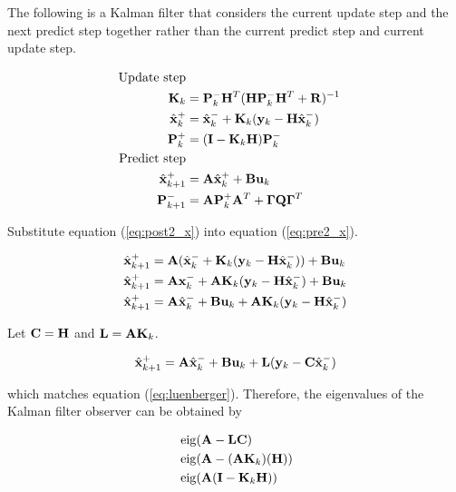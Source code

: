 The following is a Kalman filter that considers the current update step and the
next predict step together rather than the current predict step and current
update step.

\begin{align}
  \text{Update step} \nonumber \\
  \mathbf{K}_k &= \mathbf{P}_k^- \mathbf{H}^T (\mathbf{H}\mathbf{P}_k^- \mathbf{H}^T +
    \mathbf{R})^{-1} \\
  \hat{\mathbf{x}}_k^+ &= \hat{\mathbf{x}}_k^- + \mathbf{K}_k(\mathbf{y}_k -
    \mathbf{H}\hat{\mathbf{x}}_k^-) \label{eq:post2_x} \\
  \mathbf{P}_k^+ &= (\mathbf{I} - \mathbf{K}_k\mathbf{H})\mathbf{P}_k^- \\
  \text{Predict step} \nonumber \\
  \hat{\mathbf{x}}_{k+1}^+ &= \mathbf{A}\hat{\mathbf{x}}_k^+ + \mathbf{B}\mathbf{u}_k
    \label{eq:pre2_x} \\
  \mathbf{P}_{k+1}^- &= \mathbf{A} \mathbf{P}_k^+ \mathbf{A}^T +
    \mathbf{\Gamma}\mathbf{Q}\mathbf{\Gamma}^T
\end{align}

Substitute equation (\ref{eq:post2_x}) into equation (\ref{eq:pre2_x}).

\begin{align*}
  \hat{\mathbf{x}}_{k+1}^+ &= \mathbf{A}(\hat{\mathbf{x}}_k^- + \mathbf{K}_k(\mathbf{y}_k -
    \mathbf{H}\hat{\mathbf{x}}_k^-)) + \mathbf{B}\mathbf{u}_k \\
  \hat{\mathbf{x}}_{k+1}^+ &= \mathbf{A}\mathbf{x}_k^- + \mathbf{A}\mathbf{K}_k(\mathbf{y}_k -
    \mathbf{H}\hat{\mathbf{x}}_k^-) + \mathbf{B}\mathbf{u}_k \\
  \hat{\mathbf{x}}_{k+1}^+ &= \mathbf{A}\hat{\mathbf{x}}_k^- + \mathbf{B}\mathbf{u}_k +
    \mathbf{A}\mathbf{K}_k(\mathbf{y}_k - \mathbf{H}\hat{\mathbf{x}}_k^-)
\end{align*}

Let $\mathbf{C} = \mathbf{H}$ and $\mathbf{L} = \mathbf{A} \mathbf{K}_k$.

\begin{equation} \label{eq:app_kalman_leunberger}
  \hat{\mathbf{x}}_{k+1}^+ = \mathbf{A}\hat{\mathbf{x}}_k^- + \mathbf{B}\mathbf{u}_k + \mathbf{L}
    (\mathbf{y}_k - \mathbf{C}\hat{\mathbf{x}}_k^-)
\end{equation}

which matches equation (\ref{eq:luenberger}). Therefore, the eigenvalues of the
Kalman filter \gls{observer} can be obtained by

\begin{align}
  &\operatorname{eig}(\mathbf{A} - \mathbf{L}\mathbf{C}) \nonumber \\
  &\operatorname{eig}(\mathbf{A} - (\mathbf{A}\mathbf{K}_k)(\mathbf{H})) \nonumber \\
  &\operatorname{eig}(\mathbf{A}(\mathbf{I} - \mathbf{K}_k\mathbf{H}))
\end{align}

